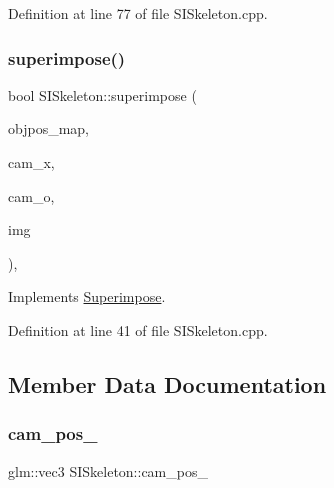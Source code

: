 Definition at line 77 of file S\+I\+Skeleton.\+cpp.

\mbox{\label{classSISkeleton_a3f49fa3419370c2597435768f280c747}} 
\subsubsection{\texorpdfstring{superimpose()}{superimpose()}}
{\footnotesize\ttfamily bool S\+I\+Skeleton\+::superimpose (\begin{DoxyParamCaption}\item[{const \mbox{\hyperlink{classSuperimpose_a178e3d4e2def6635bfcf9454dd4b5d22}{Model\+Pose\+Container}} \&}]{objpos\+\_\+map,  }\item[{const double $\ast$}]{cam\+\_\+x,  }\item[{const double $\ast$}]{cam\+\_\+o,  }\item[{cv\+::\+Mat \&}]{img }\end{DoxyParamCaption})\hspace{0.3cm}{\ttfamily [override]}, {\ttfamily [virtual]}}



Implements \mbox{\hyperlink{classSuperimpose_a62c4c269b8fc34cc36d3d54fa4acb35c}{Superimpose}}.



Definition at line 41 of file S\+I\+Skeleton.\+cpp.



\subsection{Member Data Documentation}
\mbox{\label{classSISkeleton_a63f1395d3e57e2d6a6d7de50928221a2}} 
\subsubsection{\texorpdfstring{cam\+\_\+pos\+\_\+}{cam\_pos\_}}
{\footnotesize\ttfamily glm\+::vec3 S\+I\+Skeleton\+::cam\+\_\+pos\+\_\+\hspace{0.3cm}{\ttfamily [private]}}



